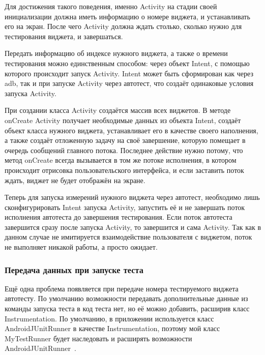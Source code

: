 \documentclass[a4paper,14pt]{extarticle} %
\begin{document}
	Для достижения такого поведения, именно Activity на стадии своей инициализации должна иметь информацию о номере виджета, и устанавливать его на экран. После чего Activity должна ждать столько, сколько нужно для тестирования виджета, и завершаться. 
	
	Передать информацию об индексе нужного виджета, а также о времени тестирования можно единственным способом: через объект Intent, с помощью которого происходит запуск Activity. Intent может быть сформирован как через adb, так и при запуске Activity через автотест, что создаёт одинаковые условия запуска Activity.
	
	При создании класса Activity создаётся массив всех виджетов. В методе onCreate Activity получает необходимые данных из объекта Intent, создаёт объект класса нужного виджета, устанавливает его в качестве своего наполнения, а также создаёт отложенную задачу на своё завершение, которую помещает в очередь сообщений главного потока. Последнее действие нужно потому, что метод onCreate всегда вызывается в том же потоке исполнения, в котором происходит отрисовка пользовательского интерфейса, и если заставить поток ждать, виджет не будет отображён на экране.
	
	Теперь для запуска измерений нужного виджета через автотест, необходимо лишь сконфигурировать Intent запуска Activity, запустить её и не завершать поток исполнения автотеста до завершения тестирования. Если поток автотеста завершится сразу после запуска Activity, то завершится и сама Activity. Так как в данном случае не имитируется взаимодействие пользователя с виджетом, поток не выполняет никакой работы, а просто ожидает.
	
	\subsubsection{Передача данных при запуске теста}
	
	Ещё одна проблема появляется при передаче номера тестируемого виджета автотесту. По умолчанию возможности передавать дополнительные данные из команды запуска теста в код теста нет, но её можно добавить, расширив класс Instrumentation. По умолчанию, в приложении используется класс AndroidJUnitRunner в качестве Instrumentation, поэтому мой класс MyTestRunner будет наследовать и расширять возможности AndroidJUnitRunner~\ris{\ref{fig:mytestrunner}}.
	
\end{document}

